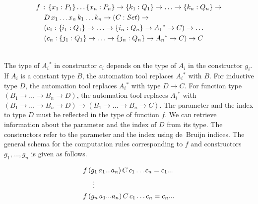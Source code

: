 \documentclass[sigplan,10pt]{acmart}
\begin{document}
\begin{center}
\begingroup
\fontsize{7.9pt}{0pt}\selectfont
\begin{align}
& f \, : \, \{x_1:P_1\}\ldots\{x_n:P_n\} \rightarrow \{k_1:Q_1\} \rightarrow\ldots\rightarrow \{k_n:Q_n\} \rightarrow \nonumber \\
& \hspace{0.4cm} D \, x_1 \dots x_n \, k_1 \ldots k_n \rightarrow (C : Set) \rightarrow \nonumber \\
& \hspace{0.4cm} (c_1 : \{i_1:Q_1\} \rightarrow\ldots\rightarrow \{i_n:Q_n\} \rightarrow A{_1}^* \rightarrow C) \rightarrow \ldots \nonumber \\
& \hspace{0.4cm} (c_n : \{j_1:Q_1\} \rightarrow\ldots\rightarrow \{j_n:Q_n\} \rightarrow A{_n}^* \rightarrow C) \rightarrow C \nonumber \\ \nonumber 
\end{align}
\endgroup
\end{center}
\normalsize

The type of $A{_i}^*$ in constructor $c_i$ depends on the type of $A_i$ in the  constructor $g_i$. If $A_i$ is a constant type $B$, the automation tool replaces $A{_i}^*$ with $B$. For inductive type $D$, the automation tool replaces $A{_i}^*$ with type $D \rightarrow C$. For function type $(B_1 \rightarrow\ldots\rightarrow B_n \rightarrow D)$, the automation tool replaces $A{_i}^*$ with $(B_1 \rightarrow\ldots\rightarrow B_n \rightarrow D) \rightarrow (B_1 \rightarrow\ldots\rightarrow B_n \rightarrow C)$. The parameter and the index to type $D$ must be reflected in the type of function $f$. We can retrieve information about the parameter and the index of $D$ from its type. The constructors refer to the parameter and the index using de~Bruijn indices. The general schema for the computation rules corresponding to $f$ and constructors $g_1, \ldots, g_n$ is given as follows.

\begin{center}
\begingroup
\fontsize{8.9pt}{2pt}\selectfont
\begin{align}
& f \, (g_1 \, a_1 ... a_n) \, C \, c_1 \ldots c_n = c_1 ... \nonumber \\
& \hspace{0.5cm} \vdots \nonumber \\
& f \, (g_n \, a_1 ... a_n) \, C \, c_1 \ldots c_n = c_n ... \nonumber \\ \nonumber
\end{align}
\endgroup
\end{center}
\normalsize
\end{document}
